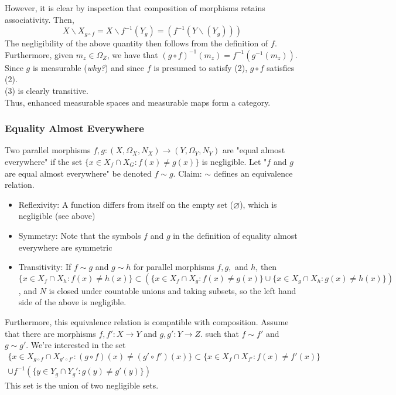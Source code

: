 \documentclass{article}
\begin{document}
	However, it is clear by inspection that composition of morphisms retains associativity.
	Then,
	\begin{equation*}
		X\backslash{}X_{g\circ{}f} = X\backslash{}f^{-1}(Y_g) = (f^{-1}(Y\backslash(Y_g)))
	\end{equation*}
	The negligibility of the above quantity then follows from the definition of $f$.\\
	Furthermore, given $m_z\in\Omega_Z$, we have that $(g\circ{}f)^{-1}(m_z) = f^{-1}(g^{-1}(m_z))$.  Since $g$ is measurable (\textit{why?}) and since $f$ is presumed to satisfy (2), $g\circ{}f$ satisfies (2).\\(3) is clearly transitive.\\Thus, enhanced measurable spaces and measurable maps form a category.
	\subsubsection{Equality Almost Everywhere}
	Two parallel morphisms $f,g: (X,\Omega_X, N_X)\rightarrow{}(Y,\Omega_Y,N_Y)$ are "equal almost everywhere" if the set $\{x\in X_f\cap{}X_G : f(x)\neq{}g(x)\}$ is negligible.  Let "$f$ and $g$ are equal almost everywhere" be denoted $f\sim{}g$.  Claim: $\sim$ defines an equivalence relation.
	\begin{itemize}
		\item Reflexivity: A function differs from itself on the empty set ($\varnothing$), which is negligible (see above)
		\item Symmetry: Note that the symbols $f$ and $g$ in the definition of equality almost everywhere are symmetric
		\item Transitivity: If $f\sim{}g$ and $g\sim{}h$ for parallel morphisms $f,g,$ and $h$, then 
		\begin{equation*}
			\{x\in X_f\cap{}X_h:f(x)\neq h(x)\}\subset{}(\{x\in X_f\cap{}X_g: f(x)\neq g(x)\}\cup{}\{x\in{}X_g\cap{}X_h: g(x)\neq{}h(x)\})
		\end{equation*}, and $N$ is closed under countable unions and taking subsets, so the left hand side of the above is negligible.
	\end{itemize}
	Furthermore, this equivalence relation is compatible with composition.  Assume that there are morphisms $f,f': X\rightarrow{}Y$ and $g,g': Y\rightarrow{}Z$. such that $f\sim{}f'$ and $g\sim{}g'$.  We're interested in the set
	\begin{multline*}
		\{ x\in{}X_{g\circ{}f}\cap X_{g'\circ{}f'} : (g\circ{}f)(x)\neq(g'\circ{}f')(x) \} \subset{} \{x\in{}X_f\cap{}X_{f'} : f(x)\neq{}f'(x)\}\\ \cup{}f^{-1}(\{y\in{}Y_g\cap{}Y_g': g(y)\neq{}g'(y)\})
	\end{multline*}
	This set is the union of two negligible sets.
\end{document}

